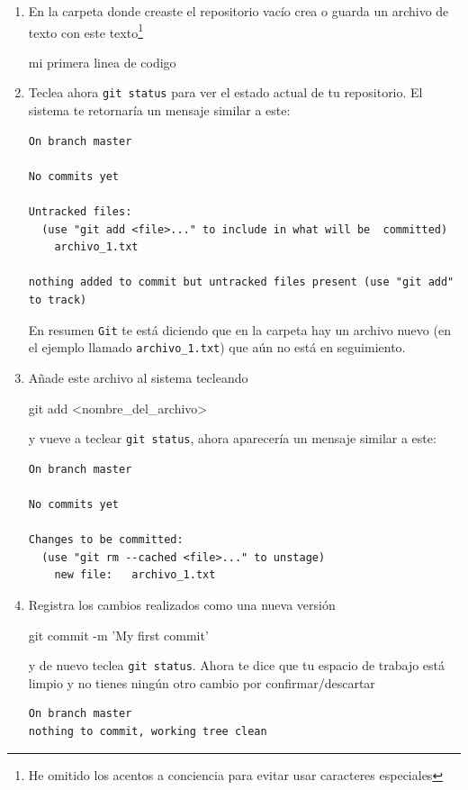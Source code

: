 \documentclass[a4paper,11pt]{report}
\newcommand{\cverb}{\Verb}
\begin{document}
\begin{enumerate}
    
    \item En la carpeta donde creaste el repositorio vacío crea o guarda un archivo de texto con este texto\footnote{He omitido los acentos a conciencia para evitar usar caracteres especiales}
    \begin{cverbatim}
mi primera linea de codigo
    \end{cverbatim}
    
    \item Teclea ahora \cverb+git status+ para ver el estado actual de tu repositorio. El sistema te retornaría un mensaje similar a este:
    
    \begin{lstlisting}[style=custom]
On branch master

No commits yet

Untracked files:
  (use "git add <file>..." to include in what will be  committed)
	archivo_1.txt

nothing added to commit but untracked files present (use "git add" to track)
    \end{lstlisting}
    En resumen \verb+Git+ te está diciendo que en la carpeta hay un archivo nuevo (en el ejemplo llamado \verb+archivo_1.txt+) que aún no está en seguimiento.

    \item Añade este archivo al sistema tecleando
    \begin{cverbatim}
git add <nombre_del_archivo>
    \end{cverbatim}
    y vueve a teclear \cverb+git status+, ahora aparecería un mensaje similar a este:
    
    \begin{lstlisting}[style=custom]
On branch master

No commits yet

Changes to be committed:
  (use "git rm --cached <file>..." to unstage)
	new file:   archivo_1.txt
    \end{lstlisting}

    \item Registra los cambios realizados como una nueva versión
    \begin{cverbatim}
git commit -m 'My first commit'
    \end{cverbatim}
    
    y de nuevo teclea \cverb+git status+. Ahora te dice que tu espacio de trabajo está limpio y no tienes ningún otro cambio por confirmar/descartar

    \begin{lstlisting}[style=custom]
On branch master
nothing to commit, working tree clean
    \end{lstlisting}
    
    \end{enumerate}
    
\end{document}

